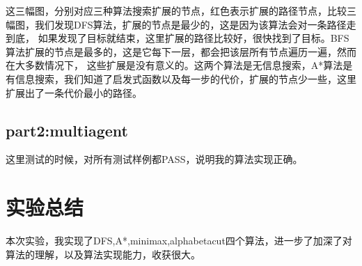 \documentclass{report}
\begin{document}
这三幅图，分别对应三种算法搜索扩展的节点，红色表示扩展的路径节点，比较三幅图，我们发现DFS算法，扩展的节点是最少的，这是因为该算法会对一条路径走到底，
如果发现了目标就结束，这里扩展的路径比较好，很快找到了目标。BFS算法扩展的节点是最多的，这是它每下一层，都会把该层所有节点遍历一遍，然而在大多数情况下，
这些扩展是没有意义的。这两个算法是无信息搜索，A*算法是有信息搜索，我们知道了启发式函数以及每一步的代价，扩展的节点少一些，这里扩展出了一条代价最小的路径。

\section{part2:multiagent}
这里测试的时候，对所有测试样例都PASS，说明我的算法实现正确。
\chapter{实验总结}
本次实验，我实现了DFS,A*,minimax,alphabetacut四个算法，进一步了加深了对算法的理解，以及算法实现能力，收获很大。
\end{document}
